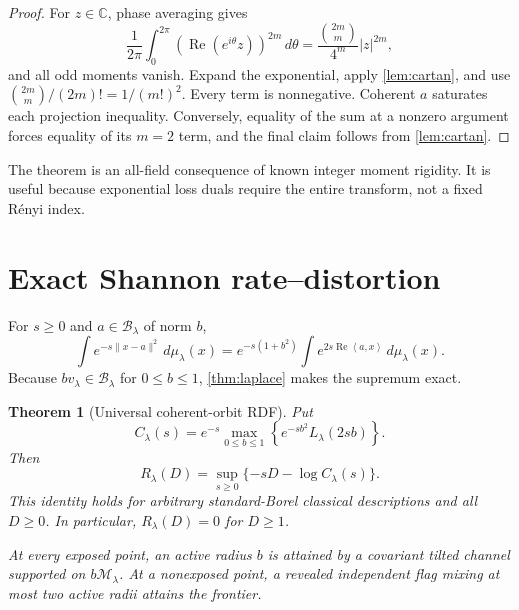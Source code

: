 \documentclass[11pt,a4paper]{article}
\newtheorem{theorem}{Theorem}[section]
\newcommand{\C}{\mathbb C}
\newcommand{\M}{\mathcal M}
\newcommand{\B}{\mathcal B}
\newcommand{\ip}[2]{\left\langle #1,#2\right\rangle}
\DeclareMathOperator{\Rea}{Re}
\begin{document}
\begin{proof}
For $z\in\C$, phase averaging gives
\[
 \frac1{2\pi}\int_0^{2\pi}
  (\Rea(e^{i\theta}z))^{2m}\,d\theta
 =\frac{\binom{2m}{m}}{4^m}|z|^{2m},
\]
and all odd moments vanish.  Expand the exponential, apply
\cref{lem:cartan}, and use
$\binom{2m}{m}/(2m)!=1/(m!)^2$.  Every term is nonnegative.  Coherent
$a$ saturates each projection inequality.  Conversely, equality of the
sum at a nonzero argument forces equality of its $m=2$ term, and the final
claim follows from \cref{lem:cartan}.
\end{proof}

The theorem is an all-field consequence of known integer moment rigidity.
It is useful because exponential loss duals require the entire transform,
not a fixed R\'enyi index.

\section{Exact Shannon rate--distortion}

For $s\ge0$ and $a\in\B_\lambda$ of norm $b$,
\[
 \int e^{-s\|x-a\|^2}\,d\mu_\lambda(x)
 =e^{-s(1+b^2)}
   \int e^{2s\Rea\ip{a}{x}}\,d\mu_\lambda(x).
 \tag{4.1}
\]
Because $bv_\lambda\in\B_\lambda$ for $0\le b\le1$,
\cref{thm:laplace} makes the supremum exact.

\begin{theorem}[Universal coherent-orbit RDF]\label{thm:rdf}
Put
\[
 C_\lambda(s)=e^{-s}\max_{0\le b\le1}
 \left\{e^{-sb^2}L_\lambda(2sb)\right\}.
 \tag{4.2}
\]
Then
\[
 \boxed{
 R_\lambda(D)=\sup_{s\ge0}\{-sD-\log C_\lambda(s)\}.}
 \tag{4.3}
\]
This identity holds for arbitrary standard-Borel classical descriptions
and all $D\ge0$.  In particular, $R_\lambda(D)=0$ for $D\ge1$.

At every exposed point, an active radius $b$ is attained by a covariant
tilted channel supported on $b\M_\lambda$.  At a nonexposed point, a
revealed independent flag mixing at most two active radii attains the
frontier.
\end{theorem}
\end{document}
